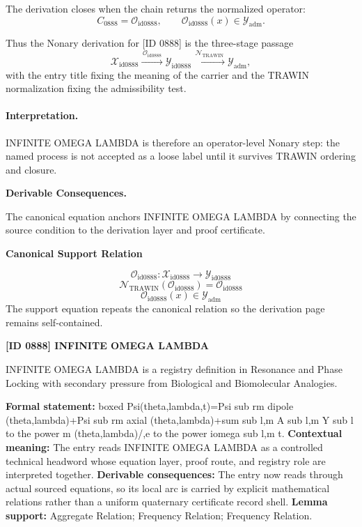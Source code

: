 The derivation closes when the chain returns the normalized operator:\[
C_{0888}=\mathcal{O}_{\mathrm{id0888}},\qquad \mathcal{O}_{\mathrm{id0888}}(x)\in\mathcal{Y}_{\mathrm{adm}}.
\]

Thus the Nonary derivation for [ID 0888] is the three-stage passage
\[
\mathcal{X}_{\mathrm{id0888}}\xrightarrow{\,\mathcal{O}_{\mathrm{id0888}}\,} \mathcal{Y}_{\mathrm{id0888}}\xrightarrow{\,\mathcal{N}_{\mathrm{TRAWIN}}\,} \mathcal{Y}_{\mathrm{adm}},
\]
with the entry title fixing the meaning of the carrier and the TRAWIN normalization fixing the admissibility test.

\paragraph{Interpretation.} INFINITE OMEGA LAMBDA is therefore an operator-level Nonary step: the named process is not accepted as a loose label until it survives TRAWIN ordering and closure.

\par\vspace{0.35em}
\noindent\textbf{Derivable Consequences.}\quad
\begingroup
\footnotesize
\raggedright
The canonical equation anchors INFINITE OMEGA LAMBDA by connecting the source condition to the derivation layer and proof certificate.
\par\endgroup

\noindent\textbf{Canonical Support Relation}\par
\[
\mathcal{O}_{\mathrm{id0888}}:\mathcal{X}_{\mathrm{id0888}}\longrightarrow\mathcal{Y}_{\mathrm{id0888}}
\]
\[
\mathcal{N}_{\mathrm{TRAWIN}}(\mathcal{O}_{\mathrm{id0888}})=\mathcal{O}_{\mathrm{id0888}}
\]
\[
\mathcal{O}_{\mathrm{id0888}}(x)\in\mathcal{Y}_{\mathrm{adm}}
\]
\noindent The support equation repeats the canonical relation so the derivation page remains self-contained.\par

\clearpage
\noindent\textbf{[ID 0888] INFINITE OMEGA LAMBDA}\par
\vspace{0.35em}
\begingroup\small
{}
INFINITE OMEGA LAMBDA is a registry definition in Resonance and Phase Locking with secondary pressure from Biological and Biomolecular Analogies.

\begingroup\footnotesize\setlength{\emergencystretch}{3em}\sloppy
\textbf{Formal statement:} boxed Psi(theta,lambda,t)=Psi sub rm dipole (theta,lambda)+Psi sub rm axial (theta,lambda)+sum sub l,m A sub l,m Y sub l to the power m (theta,lambda)/,e to the power iomega sub l,m t. \textbf{Contextual meaning:} The entry reads INFINITE OMEGA LAMBDA as a controlled technical headword whose equation layer, proof route, and registry role are interpreted together. \textbf{Derivable consequences:} The entry now reads through actual sourced equations, so its local arc is carried by explicit mathematical relations rather than a uniform quaternary certificate record shell. \textbf{Lemma support:} Aggregate Relation; Frequency Relation; Frequency Relation.\par
\endgroup

